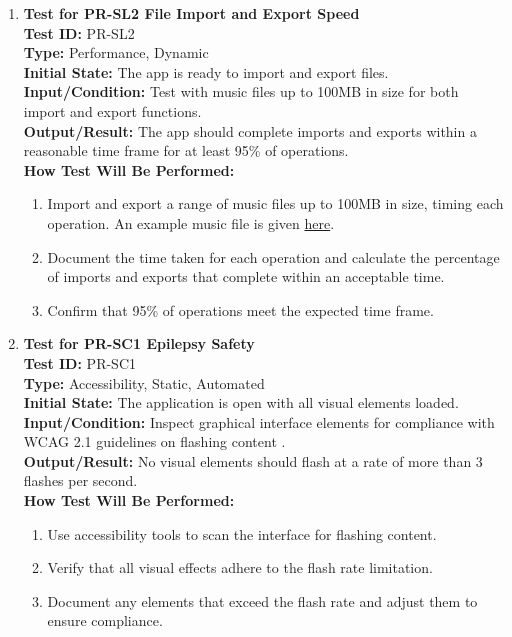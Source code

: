 \documentclass[12pt, titlepage]{article}
\begin{document}
\begin{enumerate}
    \item \textbf{Test for PR-SL2 File Import and Export Speed} \\
      \newline
      \textbf{Test ID:} PR-SL2 \\
      \textbf{Type:} Performance, Dynamic \\
      \textbf{Initial State:} The app is ready to import and export files. \\
      \textbf{Input/Condition:} Test with music files up to 100MB in size for both import and export functions. \\
      \textbf{Output/Result:} The app should complete imports and exports within a reasonable time frame for at least 95\% of operations. \\
      \textbf{How Test Will Be Performed:}
      \begin{enumerate}
          \item Import and export a range of music files up to 100MB in size, timing each operation. An example music file is given \href{https://github.com/JaakLipp/ScoreGen/blob/main/test/TestingDatasets/piano-samples/sample-songs/hot-cross-buns-piano-solo.wav}{here}.
          \item Document the time taken for each operation and calculate the percentage of imports and exports that complete within an acceptable time.
          \item Confirm that 95\% of operations meet the expected time frame.
      \end{enumerate}

    \item \textbf{Test for PR-SC1 Epilepsy Safety} \\
      \newline
      \textbf{Test ID:} PR-SC1 \\
      \textbf{Type:} Accessibility, Static, Automated \\
      \textbf{Initial State:} The application is open with all visual elements loaded. \\
      \textbf{Input/Condition:} Inspect graphical interface elements for compliance with WCAG 2.1 guidelines on flashing content \cite{WCAG21}. \\
      \textbf{Output/Result:} No visual elements should flash at a rate of more than 3 flashes per second. \\
      \textbf{How Test Will Be Performed:}
      \begin{enumerate}
          \item Use accessibility tools to scan the interface for flashing content.
          \item Verify that all visual effects adhere to the flash rate limitation.
          \item Document any elements that exceed the flash rate and adjust them to ensure compliance.
      \end{enumerate}


\end{enumerate}
\end{document}
